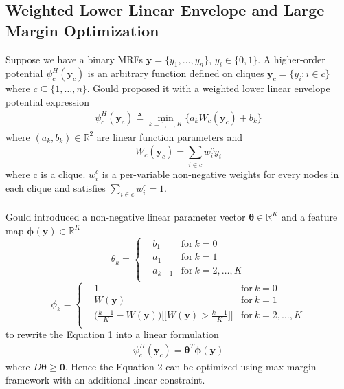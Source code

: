 \documentclass{article}
\begin{document}
	\subsection{Weighted Lower Linear Envelope and Large Margin Optimization}
	Suppose we have a binary MRFs $\mathbf{y}=\{y_1,\dots,y_n\}$, $y_i\in\{0,1\}$. A higher-order potential $\psi_c^H(\mathbf{y}_c)$ is an arbitrary function defined on cliques $\mathbf{y}_c=\{y_i : i\in c\}$ where $c\subseteq\{1,\dots,n\}$. Gould\cite{gouldlearning} proposed it with a weighted lower linear envelope potential expression
	\begin{align}
		\psi_c^H(\mathbf{y}_c) \triangleq \min_{k=1,\dots,K}\bigg\{a_kW_c(\mathbf{y}_c)+b_k\bigg\}
	\end{align}
	where $(a_k,b_k)\in\mathbb{R}^2$ are linear function parameters and
	$$
	W_c(\mathbf{y}_c) = \sum_{i\in c}^{}w_i^cy_i
	$$
	where c is a clique. $w_i^c$ is a per-variable non-negative weights for every nodes in each clique and satisfies $\sum_ {i\in c}^{}w_i^c=1$.\\\\
	Gould\cite{gouldlearning} introduced a non-negative linear parameter vector $\boldsymbol{\theta}\in\mathbb{R}^K$ and a feature map $\boldsymbol{\phi}(\mathbf{y})\in \mathbb{R}^K$ 
	\begin{equation*}
		\theta_k = \left\{
		\begin{aligned}
		& b_1	& \text{for} \ k=0\\
		& a_1 & \text{for}\ k=1\\
		& a_{k-1}  & \text{for} \ k=2,\dots,K\\
		\end{aligned}
		\right.
	\end{equation*}
	\begin{equation*}
		\phi_k = \left\{
		\begin{aligned}
		& 1	& \text{for} \ k=0\\
		& W(\mathbf{y}) & \text{for}\ k=1\\
		& \bigg(\frac{k-1}{K}-W(\mathbf{y}) \bigg)\bigg[\bigg[ W(\mathbf{y}) > \frac{k-1}{K}\bigg]\bigg]  & \text{for} \ k=2,\dots,K\\
		\end{aligned}
		\right.
	\end{equation*}
	to rewrite the Equation 1 into a linear formulation
	\begin{align}
		\psi_c^H(\mathbf{y}_c)=\boldsymbol{\theta}^T\boldsymbol{\phi}(\mathbf{y})
	\end{align}
	where $ D\boldsymbol{\theta}\geq \mathbf{0}$. Hence the Equation 2 can be optimized using max-margin framework with an additional linear constraint.
	
\end{document}
